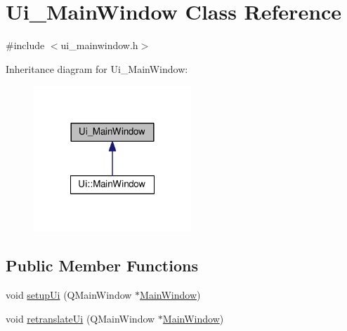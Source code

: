 \hypertarget{classUi__MainWindow}{\section{Ui\-\_\-\-Main\-Window Class Reference}
\label{classUi__MainWindow}
}


{\ttfamily \#include $<$ui\-\_\-mainwindow.\-h$>$}



Inheritance diagram for Ui\-\_\-\-Main\-Window\-:\nopagebreak
\begin{figure}[H]
\begin{center}
\leavevmode
\includegraphics[width=168pt]{classUi__MainWindow__inherit__graph}
\end{center}
\end{figure}
\subsection*{Public Member Functions}
\begin{DoxyCompactItemize}
\item 
void \hyperlink{classUi__MainWindow_acf4a0872c4c77d8f43a2ec66ed849b58}{setup\-Ui} (Q\-Main\-Window $\ast$\hyperlink{classMainWindow}{Main\-Window})
\item 
void \hyperlink{classUi__MainWindow_a097dd160c3534a204904cb374412c618}{retranslate\-Ui} (Q\-Main\-Window $\ast$\hyperlink{classMainWindow}{Main\-Window})
\end{DoxyCompactItemize}
